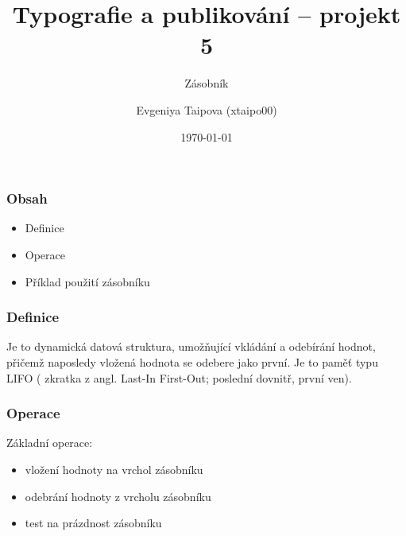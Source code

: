 \documentclass{beamer}
\title{Typografie a publikování -- projekt 5}
\subtitle{Zásobník}
\author{Evgeniya Taipova (xtaipo00)}
\date{\today}
\institute
{
	Vysoké učení technické v~Brně\\
	Fakulta informačních technologií
}
\begin{document}
  \frame{\titlepage}

  \begin{frame}
    \frametitle{Obsah}
    
    \begin{itemize}
      \item Definice
      \item Operace
      \item Příklad použití zásobníku
    \end{itemize}
  \end{frame}

  \begin{frame}
    \frametitle{Definice}
   Je to dynamická datová struktura, umožňující vkládání a odebírání hodnot, přičemž
naposledy vložená hodnota se odebere jako první.
Je to paměť typu LIFO ( zkratka z angl. Last-In First-Out; poslední dovnitř, první ven).
\newline
\begin{center}
\end{center}
  \end{frame}
  
  \begin{frame}
    \frametitle{Operace}
   Základní operace:
   \begin{itemize}
       \item vložení hodnoty na vrchol zásobníku
       \item odebrání hodnoty z vrcholu zásobníku
       \item test na prázdnost zásobníku
   \end{itemize}
  \end{frame}
 
\end{document}
